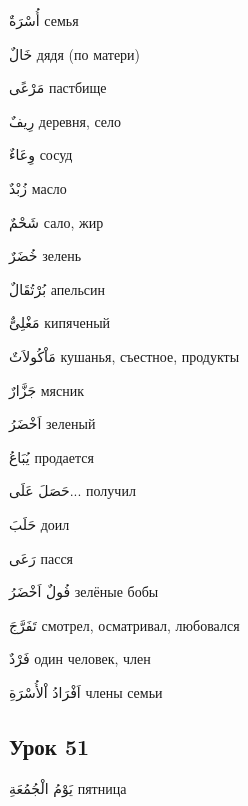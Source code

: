 \documentclass[a5paper]{article}
\newcommand\textstyleDropCaps[1]{#1}
\newcommand\textstyleCaptioncharacters[1]{#1}
\begin{document}
\textstyleCaptioncharacters{أُسْرَةٌ }\textstyleDropCaps{семья‎}

\textstyleCaptioncharacters{خَالٌ }\textstyleDropCaps{дядя (по матери)‎}

\textstyleCaptioncharacters{مَرْعًى }\textstyleDropCaps{пастбище‎}

\textstyleCaptioncharacters{رِيفٌ }\textstyleDropCaps{деревня, село‎}

\textstyleCaptioncharacters{وِعَاءٌ }\textstyleDropCaps{сосуд‎}

\textstyleCaptioncharacters{زُبْدٌ }\textstyleDropCaps{масло‎}

\textstyleCaptioncharacters{شَحْمٌ }\textstyleDropCaps{сало, жир‎}

\textstyleCaptioncharacters{خُضَرٌ }\textstyleDropCaps{зелень‎}

\textstyleCaptioncharacters{بُرْتُقَالٌ }\textstyleDropCaps{апельсин‎}

\textstyleCaptioncharacters{مَغْلِىٌّ }\textstyleDropCaps{кипяченый‎}

\textstyleCaptioncharacters{مَاْكُولاَتٌ }\textstyleDropCaps{кушанья, съестное, продукты‎}

\textstyleCaptioncharacters{جَزَّارٌ }\textstyleDropCaps{мясник‎}

\textstyleCaptioncharacters{اَخْضَرُ }\textstyleDropCaps{зеленый‎}

\textstyleCaptioncharacters{يُبَاعُ }\textstyleDropCaps{продается‎}

\textstyleCaptioncharacters{حَصَلَ عَلَى...ِ }\textstyleDropCaps{получил‎}

\textstyleCaptioncharacters{حَلَبَ }\textstyleDropCaps{доил‎}

\textstyleCaptioncharacters{رَعَى }\textstyleDropCaps{пасся‎}

\textstyleCaptioncharacters{فُولٌ اَخْضَرُ }\textstyleDropCaps{зелёные бобы‎}

\textstyleCaptioncharacters{تَفَرَّجَ }\textstyleDropCaps{смотрел, осматри­вал, любовался‎}

\textstyleCaptioncharacters{فَرْدٌ }\textstyleDropCaps{один человек, член‎}

\textstyleCaptioncharacters{اَفْرَادُ اْلأُسْرَةِ }\textstyleDropCaps{члены се­мьи‎}

\subsection[Урок 51‎]{\textstyleDropCaps{Урок 51‎}}
\textstyleCaptioncharacters{يَوْمُ الْجُمُعَةِ }\textstyleDropCaps{пятница‎}
\end{document}

